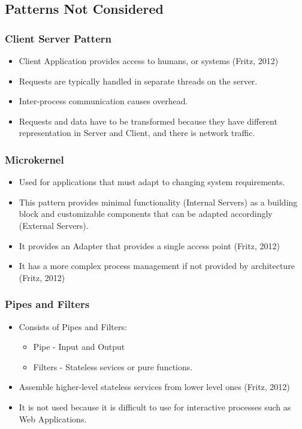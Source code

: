 \documentclass[a4paper,12pt]{article}
\begin{document}
\subsection{Patterns Not Considered}
\subsubsection{Client Server Pattern}

\begin{itemize}

\item Client Application provides access to humans, or systems (Fritz, 2012)
\item Requests are typically handled in separate threads on the server.
\item Inter-process communication causes overhead.
\item Requests and data have to be transformed because they have different representation in Server and Client, and there is network traffic.
\end{itemize}

\subsubsection{Microkernel}
\begin{itemize}
\item Used for applications that must adapt to changing system requirements.
\item This pattern provides minimal functionality (Internal Servers) as a building block and customizable components that can be adapted accordingly (External Servers).
\item It provides an Adapter that provides a single access point (Fritz, 2012)
\item It has a more complex process management if not provided by architecture (Fritz, 2012)
\end{itemize}

\subsubsection{Pipes and Filters}
\begin{itemize}
\item Consists of Pipes and Filters:
\begin{itemize}
\item Pipe - Input and Output
\item Filters - Stateless sevices or pure functions.
\end{itemize}
\item Assemble higher-level stateless services from lower level ones (Fritz, 2012)
\item It is not used because it is difficult to use for interactive processes such as Web Applications.

\end{itemize}
\end{document}
